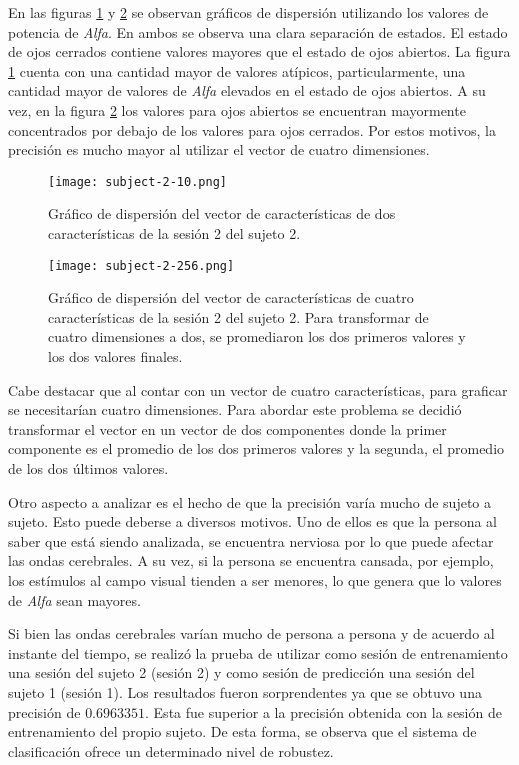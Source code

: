 En las figuras \ref{fig:subject-2-10} y \ref{fig:subject-2-256} se observan gráficos de dispersión utilizando los valores de potencia de \emph{Alfa}. En ambos se observa una clara separación de estados. El estado de ojos cerrados contiene valores mayores que el estado de ojos abiertos. La figura \ref{fig:subject-2-10}  cuenta con una cantidad mayor de valores atípicos, particularmente, una cantidad mayor de valores de \emph{Alfa} elevados en el estado de ojos abiertos. A su vez, en la figura \ref{fig:subject-2-256} los valores para ojos abiertos se encuentran mayormente concentrados por debajo de los valores para ojos cerrados. Por estos motivos, la precisión es mucho mayor al utilizar el vector de cuatro dimensiones.

 \begin{figure}[H]
	\centering
    \texttt{[image: subject-2-10.png]}
    \caption{Gráfico de dispersión del vector de características de dos características de la sesión  2 del sujeto 2.}
	\label{fig:subject-2-10}
\end{figure}

 \begin{figure}[H]
	\centering
    \texttt{[image: subject-2-256.png]}
    \caption{Gráfico de dispersión del vector de características de cuatro características de la sesión  2 del sujeto 2. Para transformar de cuatro dimensiones a dos, se promediaron los dos primeros valores y los dos valores finales.}
	\label{fig:subject-2-256}
\end{figure}

Cabe destacar que al contar con un vector de cuatro características, para graficar se necesitarían cuatro dimensiones. Para abordar este problema se decidió transformar el vector en un vector de dos componentes donde la primer componente es el promedio de los dos primeros valores y la segunda, el promedio de los dos últimos valores.

Otro aspecto a analizar es el hecho de que la precisión varía mucho de sujeto a sujeto. Esto puede deberse a diversos motivos. Uno de ellos es que la persona al saber que está siendo analizada, se encuentra nerviosa por lo que puede afectar las ondas cerebrales. A su vez, si la persona se encuentra cansada, por ejemplo, los estímulos al campo visual tienden a ser menores, lo que genera que lo valores de \emph{Alfa} sean mayores.

Si bien las ondas cerebrales varían mucho de persona a persona y de acuerdo al instante del tiempo, se realizó la prueba de utilizar como sesión de entrenamiento una sesión del sujeto 2 (sesión 2) y como sesión de predicción una sesión del sujeto 1 (sesión 1). Los resultados fueron sorprendentes ya que se obtuvo una precisión de $0.6963351$. Esta fue superior a la precisión obtenida con la sesión de entrenamiento del propio sujeto. De esta forma, se observa que el sistema de clasificación ofrece un determinado nivel de robustez.


